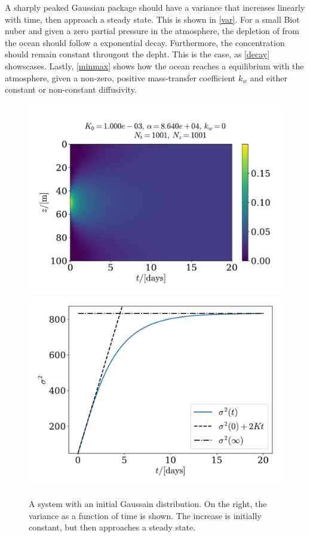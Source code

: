 \documentclass{article}
\begin{document}
    
    A sharply peaked Gaussian package should have a variance that increases linearly with time, then approach a steady state. This is shown in \autoref{var}. For a small Biot nuber and given a zero partial pressure in the atmosphere, the depletion of  from the ocean should follow a exponential decay. Furthermore, the concentration should remain constant througout the depht. This is the case, as \autoref{decay} showscases. Lastly, \autoref{minmax} shows how the ocean reaches a equilibrium with the atmosphere, given a non-zero, positive mass-transfer coefficient $k_w$ and either constant or non-constant diffusivity.

    \begin{figure}[H]
        \centering
        \includegraphics[width=.49\textwidth]{../plots/test3}
        \includegraphics[width=.45\textwidth]{../plots/test3_var}
        \caption{A system with an initial Gaussain distribution. On the right, the variance as a function of time is shown. The increase is initially constant, but then approaches a steady state.}
        \label{var}
    \end{figure}
\end{document}
